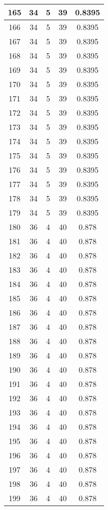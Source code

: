 \documentclass[letterpaper, 12pt]{article}
\begin{document}
\begin{longtable}{|c|c|c|c|c|}
\hline
165 & 34 & 5 & 39 & 0.8395 \\
\hline
166 & 34 & 5 & 39 & 0.8395 \\
\hline
167 & 34 & 5 & 39 & 0.8395 \\
\hline
168 & 34 & 5 & 39 & 0.8395 \\
\hline
169 & 34 & 5 & 39 & 0.8395 \\
\hline
170 & 34 & 5 & 39 & 0.8395 \\
\hline
171 & 34 & 5 & 39 & 0.8395 \\
\hline
172 & 34 & 5 & 39 & 0.8395 \\
\hline
173 & 34 & 5 & 39 & 0.8395 \\
\hline
174 & 34 & 5 & 39 & 0.8395 \\
\hline
175 & 34 & 5 & 39 & 0.8395 \\
\hline
176 & 34 & 5 & 39 & 0.8395 \\
\hline
177 & 34 & 5 & 39 & 0.8395 \\
\hline
178 & 34 & 5 & 39 & 0.8395 \\
\hline
179 & 34 & 5 & 39 & 0.8395 \\
\hline
180 & 36 & 4 & 40 & 0.878 \\
\hline
181 & 36 & 4 & 40 & 0.878 \\
\hline
182 & 36 & 4 & 40 & 0.878 \\
\hline
183 & 36 & 4 & 40 & 0.878 \\
\hline
184 & 36 & 4 & 40 & 0.878 \\
\hline
185 & 36 & 4 & 40 & 0.878 \\
\hline
186 & 36 & 4 & 40 & 0.878 \\
\hline
187 & 36 & 4 & 40 & 0.878 \\
\hline
188 & 36 & 4 & 40 & 0.878 \\
\hline
189 & 36 & 4 & 40 & 0.878 \\
\hline
190 & 36 & 4 & 40 & 0.878 \\
\hline
191 & 36 & 4 & 40 & 0.878 \\
\hline
192 & 36 & 4 & 40 & 0.878 \\
\hline
193 & 36 & 4 & 40 & 0.878 \\
\hline
194 & 36 & 4 & 40 & 0.878 \\
\hline
195 & 36 & 4 & 40 & 0.878 \\
\hline
196 & 36 & 4 & 40 & 0.878 \\
\hline
197 & 36 & 4 & 40 & 0.878 \\
\hline
198 & 36 & 4 & 40 & 0.878 \\
\hline
199 & 36 & 4 & 40 & 0.878 \\
\hline
\end{longtable}
\end{document}
